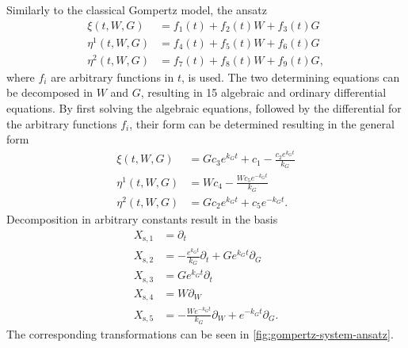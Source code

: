 Similarly to the classical Gompertz model, the ansatz
\begin{align*}
  \xi{\left(t,W,G \right)} &= f_{1}{\left(t \right)} + f_{2}{\left(t \right)} W + f_{3}{\left(t \right)} G \\
  \eta^{1}{\left(t,W,G \right)} &= f_{4}{\left(t \right)} + f_{5}{\left(t \right)} W + f_{6}{\left(t \right)} G\\
  \eta^{2}{\left(t,W,G \right)} &= f_{7}{\left(t \right)} + f_{8}{\left(t \right)} W + f_{9}{\left(t \right)} G,
\end{align*}
where \(f_i\) are arbitrary functions in \(t\), is used.
The two determining equations can be decomposed in \(W\) and \(G\), resulting in 15 algebraic and ordinary differential equations.
By first solving the algebraic equations, followed by the differential for the arbitrary functions \(f_i\), their form can be determined resulting in the general form
\begin{align*}
  \xi{\left(t,W,G \right)} &= G c_{3} e^{k_{G} t} + c_{1} - \frac{c_{2} e^{k_{G} t}}{k_{G}} \\
  \eta^{1}{\left(t,W,G \right)} &= W c_{4} - \frac{W c_{5} e^{- k_{G} t}}{k_{G}} \\
  \eta^{2}{\left(t,W,G \right)} &= G c_{2} e^{k_{G} t} + c_{5} e^{- k_{G} t}.
\end{align*}
Decomposition in arbitrary constants result in the basis
\begin{align*}
  X_{\text{s},1} &= \partial_t \\
  X_{\text{s},2} &= - \frac{e^{k_{G} t}}{k_{G}} \partial_t + G e^{k_{G} t} \partial_G \\
  X_{\text{s},3} &= G e^{k_{G} t} \partial_t \\
  X_{\text{s},4} &= W \partial_W \\
  X_{\text{s},5} &= - \frac{W e^{- k_{G} t}}{k_{G}} \partial_W + e^{- k_{G} t} \partial_G.
\end{align*}
The corresponding transformations can be seen in \cref{fig:gompertz-system-ansatz}.
